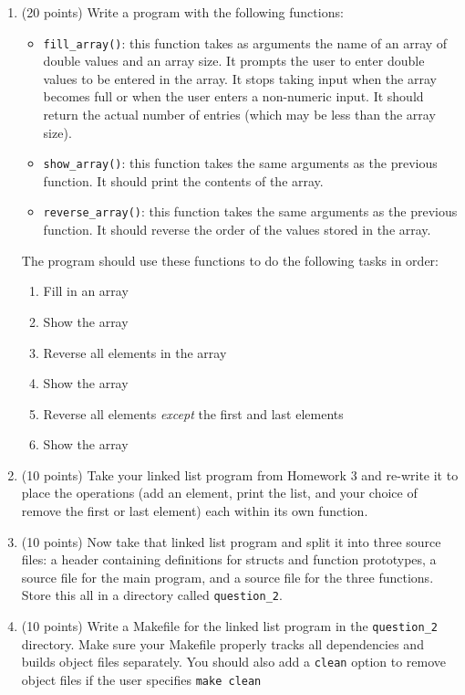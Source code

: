 \documentclass[11pt]{article}
\begin{document}
\begin{enumerate}
    \item (20 points) Write a program with the following functions:
        \begin{itemize}
            \item \texttt{fill\_array()}: this function takes as arguments the
                name of an array of double values and an array size.  It prompts
                the user to enter double values to be entered in the array.  It
                stops taking input when the array becomes full or when the user
                enters a non-numeric input.  It should return the actual number
                of entries (which may be less than the array size).
            \item \texttt{show\_array()}: this function takes the same arguments
                as the previous function.  It should print the contents of the
                array.
            \item \texttt{reverse\_array()}: this function takes the same
                arguments as the previous function.  It should reverse the order
                of the values stored in the array.
        \end{itemize}
        The program should use these functions to do the following tasks in
        order:
        \begin{enumerate}
            \item Fill in an array
            \item Show the array
            \item Reverse all elements in the array
            \item Show the array
            \item Reverse all elements \textit{except} the first and last
                elements
            \item Show the array
        \end{enumerate}
    \item (10 points) Take your linked list program from Homework 3 and re-write it to place
        the operations (add an element, print the list, and your choice of
        remove the first or last element) each within its own function.
    \item (10 points) Now take that linked list program and split it into three source files:
        a header containing definitions for structs and function prototypes, a
        source file for the main program, and a source file for the three
        functions.  Store this all in a directory called \texttt{question\_2}.
    \item (10 points) Write a Makefile for the linked list program in the
        \texttt{question\_2} directory.  Make sure your Makefile properly tracks
        all dependencies and builds object files separately.  You should also
        add a \texttt{clean} option to remove object files if the user specifies
        \texttt{make clean}
\end{enumerate}
\end{document}
